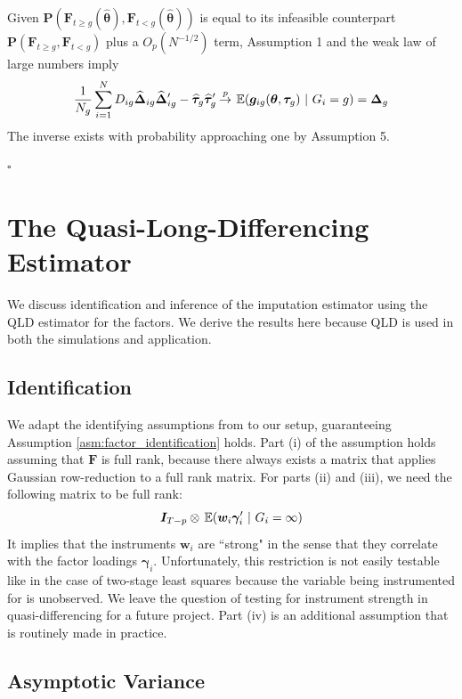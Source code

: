 \documentclass[12pt]{article}
\begin{document}
Given $\bm P(\bm{F}_{t \geq g}(\widehat{\bm{\theta}}), \bm{F}_{t < g}(\widehat{\bm{\theta}}))$ is equal to its infeasible counterpart $\bm P(\bm{F}_{t \geq g}, \bm{F}_{t < g})$ plus a $O_p(N^{-1/2})$ term, Assumption 1 and the weak law of large numbers imply 
\begin{equation*}
    \frac{1}{N_g} \sum_{i = 1}^N D_{ig} \widehat{\bm \Delta}_{ig} \widehat{\bm \Delta}_{ig}' - \widehat{\bm \tau}_g \widehat{\bm \tau}_g' \plim \expec{\bm g_{ig}(\bm{\theta}, \bm \tau_g)}{G_i = g} = \bm \Delta_g
\end{equation*}
The inverse exists with probability approaching one by Assumption 5.

$\square$

\section{The Quasi-Long-Differencing Estimator}

We discuss identification and inference of the imputation estimator using the QLD estimator for the factors. We derive the results here because QLD is used in both the simulations and application. 

\subsection{Identification}

We adapt the identifying assumptions from \citet{Ahn_Lee_Schmidt_2013} to our setup, guaranteeing Assumption \ref{asm:factor_identification} holds. Part (i) of the assumption holds assuming that $\bm F$ is full rank, because there always exists a matrix that applies Gaussian row-reduction to a full rank matrix. For parts (ii) and (iii), we need the following matrix to be full rank: 
\begin{equation}
    \bm I_{T-p} \otimes \expec{\bm w_i \bm \gamma_i'}{G_i = \infty}
\end{equation}
It implies that the instruments $\bm w_i$ are ``strong" in the sense that they correlate with the factor loadings $\bm \gamma_i$. Unfortunately, this restriction is not easily testable like in the case of two-stage least squares because the variable being instrumented for is unobserved. We leave the question of testing for instrument strength in quasi-differencing for a future project. Part (iv) is an additional assumption that is routinely made in practice. 

\subsection{Asymptotic Variance}
\end{document}
